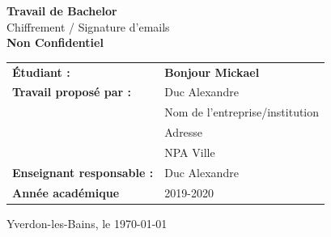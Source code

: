 \documentclass[a4paper,12pt]{report} %
\begin{document}
\begin{titlepage}
    \thispagestyle{firstpage}
    \begin{center}
    
     \vspace{1.5cm}
    
    {\huge \bfseries Travail de Bachelor \\[0.8cm] }
    {\large Chiffrement / Signature d'emails \\[0.2cm] }
    {\large \bfseries Non Confidentiel}
    
    \vspace{9.7cm}
    
    \begin{tabular}{ll}
    \textbf{Étudiant :} & \textbf{Bonjour Mickael} \\[0.1cm]
    \textbf{Travail proposé par :} & Duc Alexandre \\[0.1cm]
    & Nom de l’entreprise/institution \\
    & Adresse \\
    & NPA Ville \\
    \textbf{Enseignant responsable :} & Duc Alexandre \\[0.1cm]
    \textbf{Année académique} & 2019-2020 \\[0.1cm]
    \end{tabular}
    
    \vspace{2.0cm}
    
    \begin{flushright}
        Yverdon-les-Bains, le \today
    \end{flushright}
    
    \end{center}
    
\end{titlepage}
\pagebreak
    


\pagebreak

\pagebreak

\pagebreak

\tableofcontents
\thispagestyle{fancy}
\pagebreak

\thispagestyle{fancy}


\thispagestyle{fancy}

\end{document}
